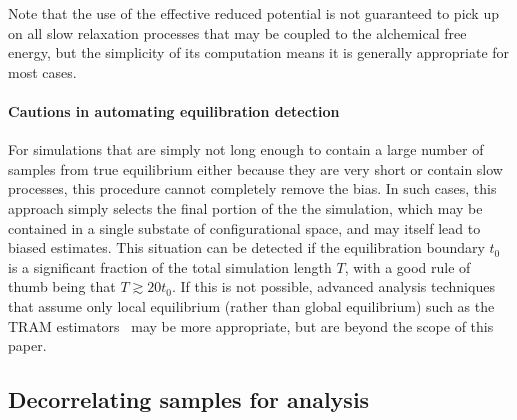 \documentclass[9pt,bestpractices,pubversion]{livecoms}
\begin{document}
Note that the use of the effective reduced potential is not guaranteed to pick up on all slow relaxation processes that may be coupled to the alchemical free energy, but the simplicity of its computation means it is generally appropriate for most cases.

\paragraph{Cautions in automating equilibration detection}
For simulations that are simply not long enough to contain a large number of samples from true equilibrium either because they are very short or contain slow processes, this procedure cannot completely remove the bias.
In such cases, this approach simply selects the final portion of the the simulation, which may be contained in a single substate of configurational space, and may itself lead to biased estimates. 
This situation can be detected if the equilibration boundary $t_0$ is a significant fraction of the total simulation length $T$, with a good rule of thumb being that $T \gtrsim 20 t_0$.
If this is not possible, advanced analysis techniques that assume only local equilibrium (rather than global equilibrium) such as the TRAM estimators~\cite{mey2014xtram,wu2016multiensemble,nuske2017markov} may be more appropriate, but are beyond the scope of this paper. 

\subsection{Decorrelating samples for analysis}
\label{sec:decorrelating-samples}
\end{document}
